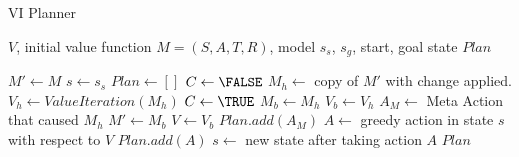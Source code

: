 \begin{algorithm}
\caption{VI Planner}
\label{alg:vi_planner}
\begin{algorithmic}
\REQUIRE $V$, initial value function
\REQUIRE $M=(S,A,T,R)$, model
\REQUIRE $s_s$, $s_g$, start, goal state
\ENSURE $Plan$


\STATE $M' \leftarrow M$
\STATE $s \leftarrow s_s$
\STATE $Plan \leftarrow []$
    \STATE $C \leftarrow \FALSE$
        \STATE $M_h \leftarrow $ copy of $M'$ with change applied.
        \STATE $V_h \leftarrow ValueIteration(M_h)$
            \STATE $C \leftarrow \TRUE$
            \STATE $M_b \leftarrow M_h$
            \STATE $V_b \leftarrow V_h$
            \STATE $A_M \leftarrow$ Meta Action that caused $M_h$
        \ENDIF
    \ENDFOR
        \STATE $M' \leftarrow M_b$
        \STATE $V \leftarrow V_b$
        \STATE $Plan.add(A_M)$
    \ENDIF
    \STATE $A \leftarrow$ greedy action in state $s$ with respect to $V$
    \STATE $Plan.add(A)$
    \STATE $s \leftarrow$ new state after taking action $A$
\ENDWHILE
\RETURN $Plan$




\end{algorithmic}
\end{algorithm}